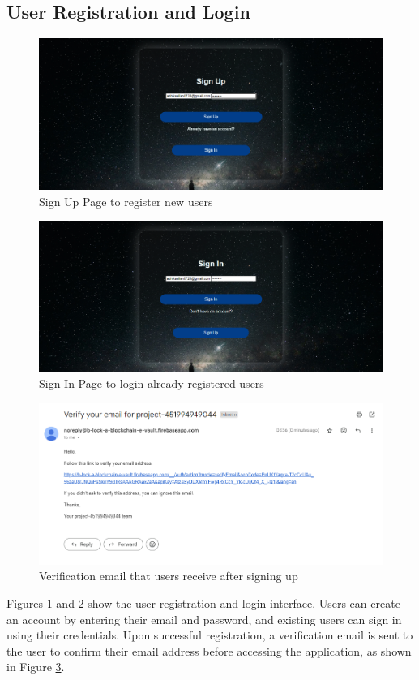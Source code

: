 \documentclass[12pt,a4paper]{report}
\begin{document}
\subsection{User Registration and Login}
\begin{figure}[hbtp]
    \centering
    \includegraphics[scale=0.4]{./pic/signup.png}
    \caption{Sign Up Page to register new users}
    \label{fig:signup}
\end{figure}
\begin{figure}[hbtp]
    \centering
    \includegraphics[scale=0.4]{./pic/signin.png}
    \caption{Sign In Page to login already registered users}
    \label{fig:signin}
\end{figure}
\begin{figure}[hbtp]
    \centering
    \includegraphics[scale=0.4]{./pic/emailver.png}
    \caption{Verification email that users receive after signing up}
    \label{fig:emailver}
\end{figure}
Figures \ref{fig:signup} and \ref{fig:signin} show the user registration and login interface. Users can create an account by entering their email and password, and existing users can sign in using their credentials. Upon successful registration, a verification email is sent to the user to confirm their email address before accessing the application, as shown in Figure \ref{fig:emailver}.
\end{document}
